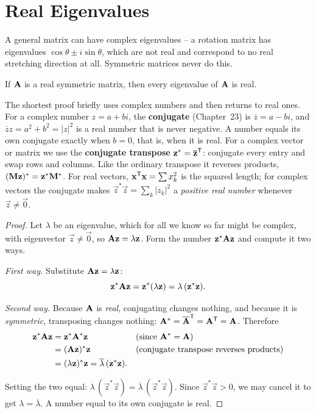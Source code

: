 \section{Real Eigenvalues}
\label{ch26:real-eigenvalues}

A general matrix can have complex eigenvalues -- a rotation matrix has eigenvalues
$\cos\theta \pm i\sin\theta$, which are not real and correspond to no
real stretching direction at all. Symmetric matrices never do this.

\begin{theorem}
\label{ch26:thm-real}
If $\mathbf{A}$ is a real symmetric matrix, then every eigenvalue of $\mathbf{A}$ is
real.
\end{theorem}

The shortest proof briefly uses complex numbers and then returns to real ones.
For a complex number $z = a + bi$, the \textbf{conjugate} (Chapter~23) is
$\overline{z} = a - bi$, and $\overline{z}z = a^2 + b^2 = |z|^2$ is a real number
that is never negative. A number equals its own conjugate exactly when $b = 0$,
that is, when it is real. For a complex vector or matrix we use the
\textbf{conjugate transpose} $\mathbf{z}^{*} = \overline{\mathbf{z}}^{\mathsf{T}}$: conjugate every
entry and swap rows and columns. Like the ordinary transpose it reverses
products, $(\mathbf{M}\mathbf{z})^{*} = \mathbf{z}^{*}\mathbf{M}^{*}$. For real vectors,
$\mathbf{x}^{\mathsf{T}}\mathbf{x} = \sum x_k^2$ is the squared length; for complex vectors the
conjugate makes $\vec{z}^{*}\vec{z} = \sum_k |z_k|^2$ a \emph{positive real
number} whenever $\vec{z}\neq\vec{0}$.

\begin{proof}
Let $\lambda$ be an eigenvalue, which for all we know so far might be complex,
with eigenvector $\vec{z}\neq\vec{0}$, so $\mathbf{A}\mathbf{z} = \lambda\mathbf{z}$. Form the
number $\mathbf{z}^{*}\mathbf{A}\mathbf{z}$ and compute it two ways.

\emph{First way.} Substitute $\mathbf{A}\mathbf{z}=\lambda\mathbf{z}$:
\[
  \mathbf{z}^{*}\mathbf{A}\mathbf{z} = \mathbf{z}^{*}(\lambda\mathbf{z}) = \lambda\,(\mathbf{z}^{*}\mathbf{z}).
\]

\emph{Second way.} Because $\mathbf{A}$ is \emph{real}, conjugating changes nothing,
and because it is \emph{symmetric}, transposing changes nothing:
$\mathbf{A}^{*} = \overline{\mathbf{A}}^{\mathsf{T}} = \mathbf{A}^{\mathsf{T}} = \mathbf{A}$. Therefore
\begin{align*}
  \mathbf{z}^{*}\mathbf{A}\mathbf{z}
  &= \mathbf{z}^{*}\mathbf{A}^{*}\mathbf{z} && \text{(since } \mathbf{A}^{*}=\mathbf{A})\\
  &= (\mathbf{A}\mathbf{z})^{*}\mathbf{z} && \text{(conjugate transpose reverses products)}\\
  &= (\lambda\mathbf{z})^{*}\mathbf{z}
  = \overline{\lambda}\,(\mathbf{z}^{*}\mathbf{z}).
\end{align*}

Setting the two equal: $\lambda\,(\vec{z}^{*}\vec{z}) = \overline{\lambda}\,(\vec{z}^{*}\vec{z})$.
Since $\vec{z}^{*}\vec{z} > 0$, we may cancel it to get $\lambda = \overline{\lambda}$.
A number equal to its own conjugate is real.
\end{proof}

